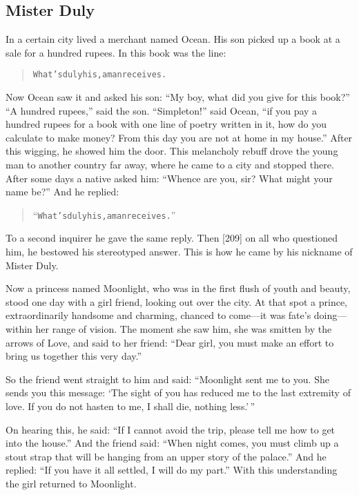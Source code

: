 \documentclass[article, twoside, 14pt]{memoir}
\renewenvironment{verbatim}{%
\begin{quote}%
\vskip -10pt%
\begin{alltt}\normalfont\large}{\end{alltt}%
\end{quote}%
\vskip -10pt
} %
\begin{document}
\subsection{Mister Duly}

\label{s41}

In a certain city lived a merchant named Ocean. His son picked up a
book at a sale for a hundred rupees. In this book was the line:

\begin{verbatim}
What's duly his, a man receives.
\end{verbatim}
Now Ocean saw it and asked his son:
``My boy, what did you give for this book?'' ``A hundred rupees,''
said the son. ``Simpleton!'' said Ocean,
``if you pay a hundred rupees for a book with one line of poetry written in it, how do you calculate to make money? From this day you are not at home in my house.''
After this wigging, he showed him the door. This melancholy rebuff
drove the young man to another country far away, where he came to a
city and stopped there. After some days a native asked him:
``Whence are you, sir? What might your name be?'' And he replied:

\begin{verbatim}
“What's duly his, a man receives.”
\end{verbatim}
To a second inquirer he gave the same reply. Then [209] on all who
questioned him, he bestowed his stereotyped answer. This is how he
came by his nickname of Mister Duly.

Now a princess named Moonlight, who was in the first flush of youth
and beauty, stood one day with a girl friend, looking out over the
city. At that spot a prince, extraordinarily handsome and charming,
chanced to come---it was fate's doing---within her range of vision.
The moment she saw him, she was smitten by the arrows of Love, and
said to her friend:
``Dear girl, you must make an effort to bring us together this very day.''

So the friend went straight to him and said:
``Moonlight sent me to you. She sends you this message: `The sight of you has reduced me to the last extremity of love. If you do not hasten to me, I shall die, nothing less.'\,''

On hearing this, he said:
``If I cannot avoid the trip, please tell me how to get into the house.''
And the friend said:
``When night comes, you must climb up a stout strap that will be hanging from an upper story of the palace.''
And he replied: ``If you have it all settled, I will do my part.''
With this understanding the girl returned to Moonlight.
\end{document}
